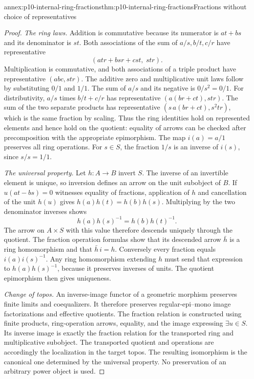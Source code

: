 \begin{annexitem}{annex:p10-internal-ring-fractions}{thm:p10-internal-ring-fractions}{Fractions without choice of representatives}
\begin{proof}
\emph{The ring laws.}
Addition is commutative because its numerator is \(at+bs\)
and its denominator is \(st\).
Both associations of the sum of \(a/s,b/t,c/r\) have representative
\[
 (atr+bsr+cst,\;str).
\]
Multiplication is commutative, and both associations of a triple
product have representative \((abc,str)\).
The additive zero and multiplicative unit laws follow by substituting
\(0/1\) and \(1/1\).
The sum of \(a/s\) and its negative is \(0/s^2=0/1\).
For distributivity, \(a/s\) times \(b/t+c/r\) has representative
\((a(br+ct),str)\).
The sum of the two separate products has representative
\((s\,a(br+ct),s^2tr)\), which is the same fraction by scaling.
Thus the ring identities hold on represented elements and hence
hold on the quotient: equality of arrows can be checked after
precomposition with the appropriate epimorphism.
The map \(i(a)=a/1\) preserves all ring operations.
For \(s\in S\), the fraction \(1/s\) is an inverse of \(i(s)\),
since \(s/s=1/1\).

\emph{The universal property.}
Let \(h:A\to B\) invert \(S\).
The inverse of an invertible element is unique, so inversion
defines an arrow on the unit subobject of \(B\).
If \(u(at-bs)=0\) witnesses equality of fractions, application
of \(h\) and cancellation of the unit \(h(u)\) gives
\(h(a)h(t)=h(b)h(s)\).
Multiplying by the two denominator inverses shows
\[
 h(a)h(s)^{-1}=h(b)h(t)^{-1}.
\]
The arrow on \(A\times S\) with this value therefore descends
uniquely through the quotient. The fraction operation formulas
show that its descended arrow \(\bar h\) is a ring homomorphism
and that \(\bar h\,i=h\).
Conversely every fraction equals \(i(a)i(s)^{-1}\).
Any ring homomorphism extending \(h\) must send that expression
to \(h(a)h(s)^{-1}\), because it preserves inverses of units.
The quotient epimorphism then gives uniqueness.

\emph{Change of topos.}
An inverse-image functor of a geometric morphism preserves finite
limits and coequalizers. It therefore preserves regular-epi--mono
image factorizations and effective quotients.
The fraction relation is constructed using finite products,
ring-operation arrows, equality, and the image expressing
\(\exists u\in S\). Its inverse image is exactly the fraction
relation for the transported ring and multiplicative subobject.
The transported quotient and operations are accordingly the
localization in the target topos. The resulting isomorphism is
the canonical one determined by the universal property.
No preservation of an arbitrary power object is used.
\end{proof}
\end{annexitem}

